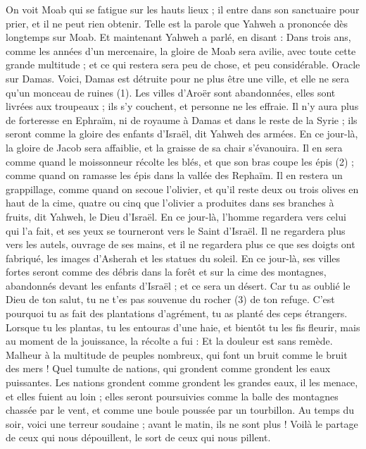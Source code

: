 \begin{multicols}{2}
On voit Moab qui se fatigue sur les hauts lieux ; il entre dans son sanctuaire pour prier, et il ne peut rien obtenir.
Telle est la parole que Yahweh a prononcée dès longtemps sur Moab.
Et maintenant Yahweh a parlé, en disant : Dans trois ans, comme les années d’un mercenaire, la gloire de Moab sera avilie, avec toute cette grande multitude ; et ce qui restera sera peu de chose, et peu considérable.
\VerseOne{}Oracle sur Damas. Voici, Damas est détruite pour ne plus être une ville, et elle ne sera qu'un monceau de ruines (1).
Les villes d'Aroër sont abandonnées, elles sont livrées aux troupeaux ; ils s’y couchent, et personne ne les effraie.
Il n'y aura plus de forteresse en Ephraïm, ni de royaume à Damas et dans le reste de la Syrie ; ils seront comme la gloire des enfants d'Israël, dit Yahweh des armées.
En ce jour-là, la gloire de Jacob sera affaiblie, et la graisse de sa chair s’évanouira.
Il en sera comme quand le moissonneur récolte les blés, et que son bras coupe les épis (2) ; comme quand on ramasse les épis dans la vallée des Rephaïm.
Il en restera un grappillage, comme quand on secoue l'olivier, et qu'il reste deux ou trois olives en haut de la cime, quatre ou cinq que l'olivier a produites dans ses branches à fruits, dit Yahweh, le Dieu d'Israël.
En ce jour-là, l'homme regardera vers celui qui l’a fait, et ses yeux se tourneront vers le Saint d'Israël.
Il ne regardera plus vers les autels, ouvrage de ses mains, et il ne regardera plus ce que ses doigts ont fabriqué, les images d’Asherah et les statues du soleil.
En ce jour-là, ses villes fortes seront comme des débris dans la forêt et sur la cime des montagnes, abandonnés devant les enfants d'Israël ; et ce sera un désert.
Car tu as oublié le Dieu de ton salut, tu ne t'es pas souvenue du rocher (3) de ton refuge. C’est pourquoi tu as fait des plantations d’agrément, tu as planté des ceps étrangers.
Lorsque tu les plantas, tu les entouras d’une haie, et bientôt tu les fis fleurir, mais au moment de la jouissance, la récolte a fui : Et la douleur est sans remède.
Malheur à la multitude de peuples nombreux, qui font un bruit comme le bruit des mers ! Quel tumulte de nations, qui grondent comme grondent les eaux puissantes.
Les nations grondent comme grondent les grandes eaux, il les menace, et elles fuient au loin ; elles seront poursuivies comme la balle des montagnes chassée par le vent, et comme une boule poussée par un tourbillon.
Au temps du soir, voici une terreur soudaine ; avant le matin, ils ne sont plus ! Voilà le partage de ceux qui nous dépouillent, le sort de ceux qui nous pillent.

\end{multicols}
